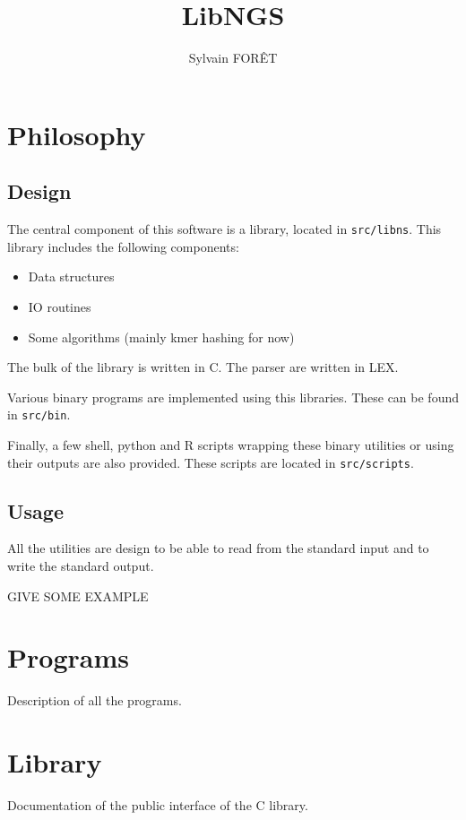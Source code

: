 \documentclass[a4paper,12pt]{article}
\title{LibNGS}
\author{Sylvain FOR\^ET}
\begin{document}
\maketitle

\newpage

\tableofcontents

\newpage

\section{Philosophy}

\subsection{Design}

The central component of this software is a library, located in
\texttt{src/libns}.
This library includes the following components:
\begin{itemize}
    \item Data structures
    \item IO routines
    \item Some algorithms (mainly kmer hashing for now)
\end{itemize}
The bulk of the library is written in C.
The parser are written in LEX.

Various binary programs are implemented using this libraries.
These can be found in \texttt{src/bin}.

Finally, a few shell, python and R scripts wrapping these binary utilities or
using their outputs are also provided.
These scripts are located in \texttt{src/scripts}.

\subsection{Usage}

All the utilities are design to be able to read from the standard input and to
write the standard output.

GIVE SOME EXAMPLE

\section{Programs}

Description of all the programs.

\section{Library}

Documentation of the public interface of the C library.
\end{document}
